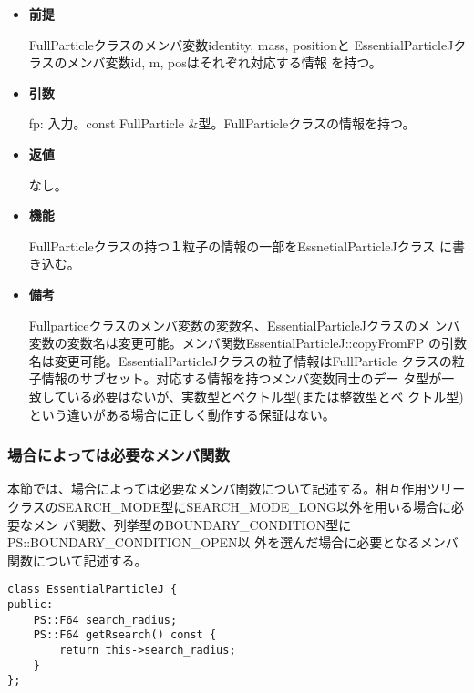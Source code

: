 \begin{itemize}

\item {\bf 前提}

  FullParticleクラスのメンバ変数identity, mass, positionと
  EssentialParticleJクラスのメンバ変数id, m, posはそれぞれ対応する情報
  を持つ。

\item {\bf 引数}

  fp: 入力。const FullParticle \&型。FullParticleクラスの情報を持つ。
  
\item {\bf 返値}

  なし。
  
\item {\bf 機能}

  FullParticleクラスの持つ１粒子の情報の一部をEssnetialParticleJクラス
  に書き込む。
  
\item {\bf 備考}

  Fullparticeクラスのメンバ変数の変数名、EssentialParticleJクラスのメ
  ンバ変数の変数名は変更可能。メンバ関数EssentialParticleJ::copyFromFP
  の引数名は変更可能。EssentialParticleJクラスの粒子情報はFullParticle
  クラスの粒子情報のサブセット。対応する情報を持つメンバ変数同士のデー
  タ型が一致している必要はないが、実数型とベクトル型(または整数型とベ
  クトル型)という違いがある場合に正しく動作する保証はない。

\end{itemize}

\subsubsection{場合によっては必要なメンバ関数}


本節では、場合によっては必要なメンバ関数について記述する。相互作用ツリー
クラスのSEARCH\_MODE型にSEARCH\_MODE\_LONG以外を用いる場合に必要なメン
バ関数、列挙型のBOUNDARY\_CONDITION型にPS::BOUNDARY\_CONDITION\_OPEN以
外を選んだ場合に必要となるメンバ関数について記述する。



\begin{screen}
\begin{verbatim}
class EssentialParticleJ {
public:
    PS::F64 search_radius;
    PS::F64 getRsearch() const {
        return this->search_radius;
    }
};
\end{verbatim}
\end{screen}

